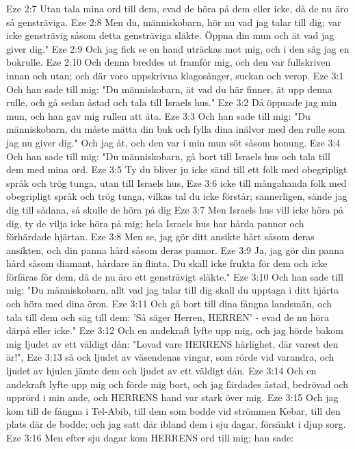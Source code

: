 Eze 2:7  Utan tala mina ord till dem, evad de höra på dem eller icke, då de nu äro så gensträviga.
Eze 2:8  Men du, människobarn, hör nu vad jag talar till dig; var icke gensträvig såsom detta gensträviga släkte. Öppna din mun och ät vad jag giver dig."
Eze 2:9  Och jag fick se en hand uträckas mot mig, och i den såg jag en bokrulle.
Eze 2:10  Och denna breddes ut framför mig, och den var fullskriven innan och utan; och där voro uppskrivna klagosånger, suckan och verop.
Eze 3:1  Och han sade till mig: "Du människobarn, ät vad du här finner, ät upp denna rulle, och gå sedan åstad och tala till Israels hus."
Eze 3:2  Då öppnade jag min mun, och han gav mig rullen att äta.
Eze 3:3  Och han sade till mig: "Du människobarn, du måste mätta din buk och fylla dina inälvor med den rulle som jag nu giver dig." Och jag åt, och den var i min mun söt såsom honung.
Eze 3:4  Och han sade till mig: "Du människobarn, gå bort till Israels hus och tala till dem med mina ord.
Eze 3:5  Ty du bliver ju icke sänd till ett folk med obegripligt språk och trög tunga, utan till Israels hus,
Eze 3:6  icke till mångahanda folk med obegripligt språk och trög tunga, vilkas tal du icke förstår; sannerligen, sände jag dig till sådana, så skulle de höra på dig
Eze 3:7  Men Israels hus vill icke höra på dig, ty de vilja icke höra på mig; hela Israels hus har hårda pannor och förhärdade hjärtan.
Eze 3:8  Men se, jag gör ditt ansikte hårt såsom deras ansikten, och din panna hård såsom deras pannor.
Eze 3:9  Ja, jag gör din panna hård såsom diamant, hårdare än flinta. Du skall icke frukta för dem och icke förfäras för dem, då de nu äro ett gensträvigt släkte."
Eze 3:10  Och han sade till mig: "Du människobarn, allt vad jag talar till dig skall du upptaga i ditt hjärta och höra med dina öron.
Eze 3:11  Och gå bort till dina fångna landsmän, och tala till dem och säg till dem: 'Så säger Herren, HERREN' - evad de nu höra därpå eller icke."
Eze 3:12  Och en andekraft lyfte upp mig, och jag hörde bakom mig ljudet av ett väldigt dån: "Lovad vare HERRENS härlighet, där varest den är!",
Eze 3:13  så ock ljudet av väsendenas vingar, som rörde vid varandra, och ljudet av hjulen jämte dem och ljudet av ett väldigt dån.
Eze 3:14  Och en andekraft lyfte upp mig och förde mig bort, och jag färdades åstad, bedrövad och upprörd i min ande, och HERRENS hand var stark över mig.
Eze 3:15  Och jag kom till de fångna i Tel-Abib, till dem som bodde vid strömmen Kebar, till den plats där de bodde; och jag satt där ibland dem i sju dagar, försänkt i djup sorg.
Eze 3:16  Men efter sju dagar kom HERRENS ord till mig; han sade:
